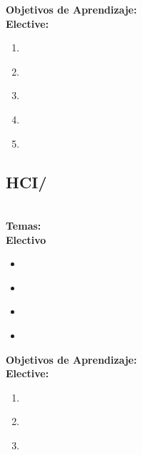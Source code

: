 \noindent \textbf{Objetivos de Aprendizaje:}\\
\noindent \textbf{Elective:}
\begin{enumerate}
	\setcounter{enumi}{0}
	\item \HCIHumanfactorsandsecurityLOExplainThePhishing\xspace[\HCIHumanfactorsandsecurityLOExplainThePhishingLevel]\label{sec:BOK:HCIHumanfactorsandsecurityLOExplainThePhishing}
	\item \HCIHumanfactorsandsecurityLODescribeTheTrust\xspace[\HCIHumanfactorsandsecurityLODescribeTheTrustLevel]\label{sec:BOK:HCIHumanfactorsandsecurityLODescribeTheTrust}
	\item \HCIHumanfactorsandsecurityLODesignAForMechanism\xspace[\HCIHumanfactorsandsecurityLODesignAForMechanismLevel]\label{sec:BOK:HCIHumanfactorsandsecurityLODesignAForMechanism}
	\item \HCIHumanfactorsandsecurityLOExplainTheIdentity\xspace[\HCIHumanfactorsandsecurityLOExplainTheIdentityLevel]\label{sec:BOK:HCIHumanfactorsandsecurityLOExplainTheIdentity}
	\item \HCIHumanfactorsandsecurityLOAnalyzeAAnd\xspace[\HCIHumanfactorsandsecurityLOAnalyzeAAndLevel]\label{sec:BOK:HCIHumanfactorsandsecurityLOAnalyzeAAnd}
\end{enumerate}


\subsection{HCI/\HCIDesignorientedHCI}\label{sec:BOK:HCIDesignorientedHCI}
\HCIDesignorientedHCIDescription\\
\noindent \textbf{Temas:}\\
\noindent \textbf{Electivo}
\begin{itemize}
	\item \HCIDesignorientedHCITopicIntellectual\label{sec:BOK:HCIDesignorientedHCITopicIntellectual}
	\item \HCIDesignorientedHCITopicConsideration\label{sec:BOK:HCIDesignorientedHCITopicConsideration}
	\item \HCIDesignorientedHCITopicCritically\label{sec:BOK:HCIDesignorientedHCITopicCritically}
	\item \HCIDesignorientedHCITopicIndicative\label{sec:BOK:HCIDesignorientedHCITopicIndicative}
\end{itemize}


\noindent \textbf{Objetivos de Aprendizaje:}\\
\noindent \textbf{Elective:}
\begin{enumerate}
	\setcounter{enumi}{0}
	\item \HCIDesignorientedHCILOExplainWhat\xspace[\HCIDesignorientedHCILOExplainWhatLevel]\label{sec:BOK:HCIDesignorientedHCILOExplainWhat}
	\item \HCIDesignorientedHCILODetail\xspace[\HCIDesignorientedHCILODetailLevel]\label{sec:BOK:HCIDesignorientedHCILODetail}
	\item \HCIDesignorientedHCILOApplyA\xspace[\HCIDesignorientedHCILOApplyALevel]\label{sec:BOK:HCIDesignorientedHCILOApplyA}
\end{enumerate}


